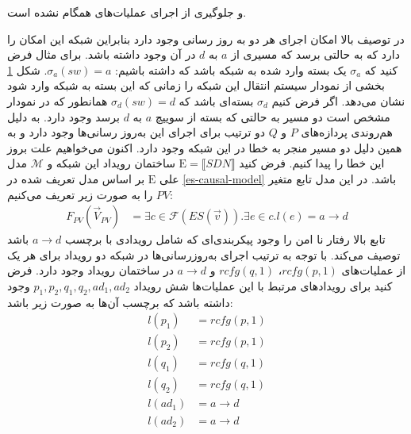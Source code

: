 \documentclass[
msc,
irfonts
]{./tex/tehran-thesis}
\newcommand{\پ}{پروژه/پایان‌نامه/رساله }
\theoremstyle{definition}
\theoremstyle{theorem}
\theoremstyle{definition}
\numberwithin{algorithm}{chapter}
\newcommand{\sem}[1]{\llbracket #1 \rrbracket}
\newcommand{\his}[1]{\langle #1 \rangle}
\newcommand{\ra}{\rightarrow}
\newcommand{\mc}[1]{\mathcal{#1}}
\newcommand{\mr}[1]{\mathrm{#1}}
\newcommand{\f}[1]{F_{#1}(\vec V_{#1})}
\begin{document}
و جلوگیری از اجرای عملیات‌های همگام نشده است.
\begin{figure}
    \centering
    \caption{}
    \label{fig:blacklist:lts}
\end{figure}
در توصیف بالا امکان اجرای هر دو به روز رسانی وجود دارد
بنابراین شبکه این امکان را دارد که به حالتی برسد که مسیری از 
$a$
به
$d$
در آن وجود داشته باشد.
برای مثال فرض کنید که
$\sigma_a$
یک بسته وارد شده به شبکه باشد که داشته باشیم:
$\sigma_a(sw) = a$.
شکل
\ref{fig:blacklist:lts}
بخشی از نمودار سیستم انتقال این شبکه را زمانی که این بسته به شبکه وارد شود نشان می‌دهد.
اگر فرض کنیم
$\sigma_d$
بسته‌ای باشد که
$\sigma_d(sw) = d$
همانطور که در نمودار مشخص است دو مسیر به حالتی که بسته از سوییچ
$a$
به
$d$
برسد وجود دارد.
به دلیل هم‌روندی پردازه‌های
$P$
و
$Q$
دو ترتیب برای اجرای این به‌روز رسانی‌ها وجود دارد و به همین دلیل دو مسیر منجر به خطا در این شبکه وجود دارد.
اکنون می‌خواهیم علت بروز این خطا را پیدا کنیم.
فرض کنید
$\mr{E} = \sem{SDN}$
ساختمان رویداد این شبکه و
$\mc{M}$
مدل علی
$\mr{E}$
بر اساس مدل تعریف شده در
\ref{es-causal-model}
باشد.
در این مدل تابع متغیر
$PV$
را به صورت زیر تعریف می‌کنیم:
\begin{align*}
    \f{PV} & = \exists c \in \mc{F}(ES(\vec v)). \exists e \in c. l(e) = a\ra d
\end{align*}
تابع بالا رفتار نا امن را وجود پیکربندی‌ای که شامل رویدادی با برچسب 
$a \ra d$
باشد توصیف می‌کند.
با توجه به ترتیب اجرای به‌روز‌رسانی‌ها در شبکه دو رویداد برای هر یک از عملیات‌های
$rcfg(p,1)$،
$rcfg(q,1)$
و
$a \ra d$
در ساختمان رویداد وجود دارد.
فرض کنید برای رویداد‌های مرتبط با این عملیات‌ها شش رویداد
$p_1,p_2,q_1,q_2,ad_1,ad_2$
وجود داشته باشد که برچسب آن‌ها به صورت زیر باشد:
\begin{align*}
    l(p_1) & = rcfg(p,1) \\
    l(p_2) & = rcfg(p,1) \\
    l(q_1) & = rcfg(q,1) \\
    l(q_2) & = rcfg(q,1) \\
    l(ad_1) & = a \ra d \\
    l(ad_2) & = a \ra d 
\end{align*}
\end{document}
